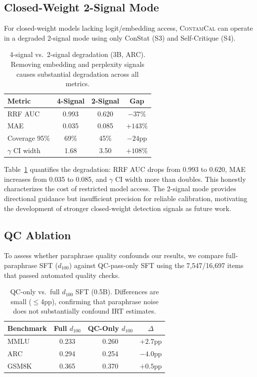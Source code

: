 \documentclass[11pt,a4paper]{article}
\newcommand{\contamcal}{\textsc{ContamCal}}
\begin{document}
\subsection{Closed-Weight 2-Signal Mode}
\label{sec:closed_weight}

For closed-weight models lacking logit/embedding access, \contamcal{} can operate in a degraded 2-signal mode using only ConStat (S3) and Self-Critique (S4).

\begin{table}[t]
\centering
\caption{4-signal vs.\ 2-signal degradation (3B, ARC). Removing embedding and perplexity signals causes substantial degradation across all metrics.}
\label{tab:2signal}
\small
\begin{tabular}{lccc}
\toprule
Metric & 4-Signal & 2-Signal & Gap \\
\midrule
RRF AUC     & 0.993 & 0.620 & $-37\%$ \\
MAE         & 0.035 & 0.085 & $+143\%$ \\
Coverage 95\% & 69\% & 45\%  & $-24$pp \\
$\gamma$ CI width & 1.68 & 3.50 & $+108\%$ \\
\bottomrule
\end{tabular}
\end{table}

Table~\ref{tab:2signal} quantifies the degradation: RRF AUC drops from 0.993 to 0.620, MAE increases from 0.035 to 0.085, and $\gamma$ CI width more than doubles. This honestly characterizes the cost of restricted model access. The 2-signal mode provides directional guidance but insufficient precision for reliable calibration, motivating the development of stronger closed-weight detection signals as future work.

\subsection{QC Ablation}
\label{sec:qc}

To assess whether paraphrase quality confounds our results, we compare full-paraphrase SFT ($d_{100}$) against QC-pass-only SFT using the 7,547/16,697 items that passed automated quality checks.

\begin{table}[t]
\centering
\caption{QC-only vs.\ full $d_{100}$ SFT (0.5B). Differences are small ($\leq$4pp), confirming that paraphrase noise does not substantially confound IRT estimates.}
\label{tab:qc_ablation}
\small
\begin{tabular}{lccc}
\toprule
Benchmark & Full $d_{100}$ & QC-Only $d_{100}$ & $\Delta$ \\
\midrule
MMLU  & 0.233 & 0.260 & $+2.7$pp \\
ARC   & 0.294 & 0.254 & $-4.0$pp \\
GSM8K & 0.365 & 0.370 & $+0.5$pp \\
\bottomrule
\end{tabular}
\end{table}
\end{document}
